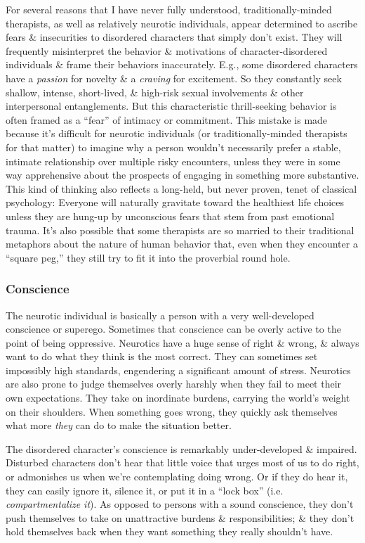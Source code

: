 \documentclass{article}
\numberwithin{equation}{section}
\begin{document}
For several reasons that I have never fully understood, traditionally-minded therapists, as well as relatively neurotic individuals, appear determined to ascribe fears \& insecurities to disordered characters that simply don't exist. They will frequently misinterpret the behavior \& motivations of character-disordered individuals \& frame their behaviors inaccurately. E.g., some disordered characters have a \textit{passion} for novelty \& a \textit{craving} for excitement. So they constantly seek shallow, intense, short-lived, \& high-risk sexual involvements \& other interpersonal entanglements. But this characteristic thrill-seeking behavior is often framed as a ``fear'' of intimacy or commitment. This mistake is made because it's difficult for neurotic individuals (or traditionally-minded therapists for that matter) to imagine why a person wouldn't necessarily prefer a stable, intimate relationship over multiple risky encounters, unless they were in some way apprehensive about the prospects of engaging in something more substantive. This kind of thinking also reflects a long-held, but never proven, tenet of classical psychology: Everyone will naturally gravitate toward the healthiest life choices unless they are hung-up by unconscious fears that stem from past emotional trauma. It's also possible that some therapists are so married to their traditional metaphors about the nature of human behavior that, even when they encounter a ``square peg,'' they still try to fit it into the proverbial round hole.

\subsubsection{Conscience}
The neurotic individual is basically a person with a very well-developed conscience or superego. Sometimes that conscience can be overly active to the point of being oppressive. Neurotics have a huge sense of right \& wrong, \& always want to do what they think is the most correct. They can sometimes set impossibly high standards, engendering a significant amount of stress. Neurotics are also prone to judge themselves overly harshly when they fail to meet their own expectations. They take on inordinate burdens, carrying the world's weight on their shoulders. When something goes wrong, they quickly ask themselves what more  \textit{they} can do to make the situation better.
	

The disordered character's conscience is remarkably under-developed \& impaired. Disturbed characters don't hear that little voice that urges most of us to do right, or admonishes us when we're contemplating doing wrong. Or if they do hear it, they can easily ignore it, silence it, or put it in a ``lock box'' (i.e. \textit{compartmentalize it}). As opposed to persons with a sound conscience, they don't push themselves to take on unattractive burdens \& responsibilities; \& they don't hold themselves back when they want something they really shouldn't have.
\end{document}
